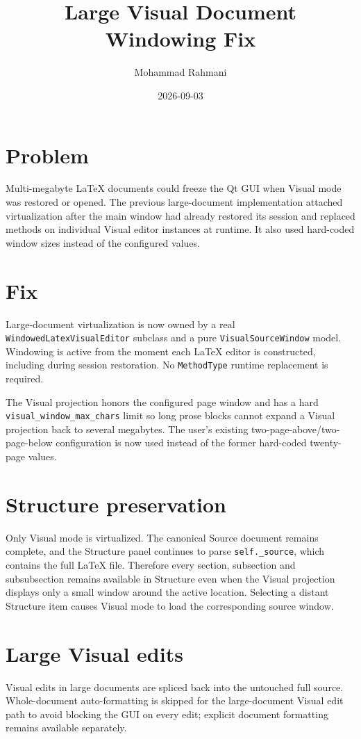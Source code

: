 \documentclass[a4paper]{article}
\title{Large Visual Document Windowing Fix}
\date{2026-09-03}
\author{Mohammad Rahmani}
\begin{document}
   \maketitle

   \section{Problem}
   Multi-megabyte LaTeX documents could freeze the Qt GUI when Visual mode was restored or opened. The previous large-document implementation attached virtualization after the main window had already restored its session and replaced methods on individual Visual editor instances at runtime. It also used hard-coded window sizes instead of the configured values.

   \section{Fix}
   Large-document virtualization is now owned by a real \texttt{WindowedLatexVisualEditor} subclass and a pure \texttt{VisualSourceWindow} model. Windowing is active from the moment each LaTeX editor is constructed, including during session restoration. No \texttt{MethodType} runtime replacement is required.

   The Visual projection honors the configured page window and has a hard \texttt{visual\_window\_max\_chars} limit so long prose blocks cannot expand a Visual projection back to several megabytes. The user's existing two-page-above/two-page-below configuration is now used instead of the former hard-coded twenty-page values.

   \section{Structure preservation}
   Only Visual mode is virtualized. The canonical Source document remains complete, and the Structure panel continues to parse \texttt{self.\_source}, which contains the full LaTeX file. Therefore every section, subsection and subsubsection remains available in Structure even when the Visual projection displays only a small window around the active location. Selecting a distant Structure item causes Visual mode to load the corresponding source window.

   \section{Large Visual edits}
   Visual edits in large documents are spliced back into the untouched full source. Whole-document auto-formatting is skipped for the large-document Visual edit path to avoid blocking the GUI on every edit; explicit document formatting remains available separately.

   
   
\end{document}
